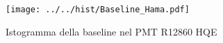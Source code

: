 \begin{figure}[h] \centering \texttt{[image: ../../hist/Baseline\_Hama.pdf]}\caption{Istogramma della baseline nel PMT R12860 HQE}\label{hist:Baseline_Hama} \end{figure}
